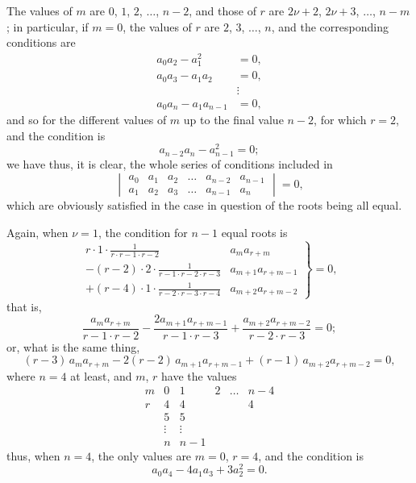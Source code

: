 \documentclass[11pt,a4paper]{article}
\theoremstyle{cayley}
\begin{document}
The values of $m$ are $0$, $1$, $2$, $\dots$, $n-2$, and those of $r$ are $2\nu+2$, $2\nu+3$, $\dots$, $n-m$; in particular, if $m=0$, the values of $r$ are $2$, $3$, $\dots$, $n$, and the corresponding conditions are
\begin{align*}
a_{0}a_{2} - a_{1}^{2} &= 0,\\
a_{0}a_{3} - a_{1}a_{2} &= 0,\\
&\vdots\\
a_{0}a_{n} - a_{1}a_{n-1} &= 0,
\end{align*}
and so for the different values of $m$ up to the final value $n-2$, for which $r=2$, and the condition is
\[
a_{n-2}a_{n} - a_{n-1}^{2} = 0;
\]
we have thus, it is clear, the whole series of conditions included in
\[
\begin{vmatrix}
a_{0} & a_{1} & a_{2} & \dots & a_{n-2} & a_{n-1} \\
a_{1} & a_{2} & a_{3} & \dots & a_{n-1} & a_{n}
\end{vmatrix} = 0,
\]
which are obviously satisfied in the case in question of the roots being all equal.

Again, when $\nu=1$, the condition for $n-1$ equal roots is
\[
\left.\begin{aligned}
r \cdot 1 \cdot \frac{1}{r \cdot r-1 \cdot r-2} & a_{m}a_{r+m}\\
- (r-2) \cdot 2 \cdot \frac{1}{r-1 \cdot r-2 \cdot r-3} & a_{m+1}a_{r+m-1}\\
+ (r-4) \cdot 1 \cdot \frac{1}{r-2 \cdot r-3 \cdot r-4} & a_{m+2}a_{r+m-2}
\end{aligned}\right\} = 0,
\]
that is,
\[
\frac{a_{m}a_{r+m}}{r-1 \cdot r-2} - \frac{2a_{m+1}a_{r+m-1}}{r-1 \cdot r-3} + \frac{a_{m+2}a_{r+m-2}}{r-2 \cdot r-3} = 0;
\]
or, what is the same thing,
\[
(r-3)\,a_{m}a_{r+m} - 2(r-2)\,a_{m+1}a_{r+m-1} + (r-1)\,a_{m+2}a_{r+m-2} = 0,
\]
where $n=4$ at least, and $m$, $r$ have the values
\[
\begin{array}{c|ccccc}
m & 0 & 1 & 2 & \dots & n-4 \\ \hline
r & 4 & 4 & & & 4 \\
  & 5 & 5 & & & \\
  & \vdots & \vdots & & & \\
  & n & n-1 & & &
\end{array}
\]
thus, when $n=4$, the only values are $m=0$, $r=4$, and the condition is
\[
a_{0}a_{4} - 4a_{1}a_{3} + 3a_{2}^{2} = 0.
\]
\end{document}
